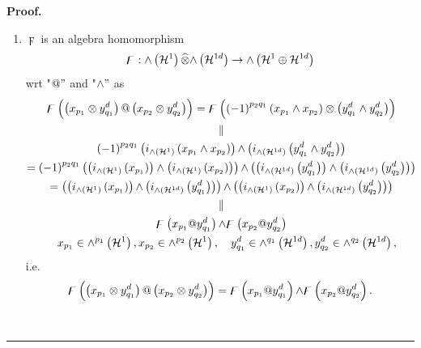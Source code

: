 \documentclass[aps,preprint]{revtex4}%
\newenvironment{proof}[1][Proof]{\noindent\textbf{#1.} }{\ \rule{0.5em}{0.5em}}
\begin{document}
\begin{proof}
\begin{enumerate}
\item $\digamma$ is an algebra homomorphism
\begin{equation}
\digamma:{\huge \wedge}\left(  \mathcal{H}^{1}\right)  \widehat{\otimes
}{\huge \wedge}\left(  \mathcal{H}^{1d}\right)  \rightarrow{\huge \wedge
}\left(  \mathcal{H}^{1}\oplus\mathcal{H}^{1d}\right)
\end{equation}
wrt "$@"$ and "$\wedge"$ as
\begin{gather}
\digamma\left(  \overset{}{\left(  x_{p_{1}}\otimes y_{q_{1}}^{d}\right)
@\left(  x_{p_{2}}\otimes y_{q_{2}}^{d}\right)  }\right)  =\digamma\left(
\overset{}{\left(  -1\right)  ^{p_{2}q_{1}}\left(  x_{p_{1}}\wedge x_{p_{2}%
}\right)  \otimes\left(  y_{q_{1}}^{d}\wedge y_{q_{2}}^{d}\right)  }\right) \\
\parallel\\
\left(  -1\right)  ^{p_{2}q_{1}}\left(  i_{{\huge \wedge}\left(
\mathcal{H}^{1}\right)  }\left(  x_{p_{1}}\wedge x_{p_{2}}\right)  \right)
{\Large \wedge}\left(  i_{{\huge \wedge}\left(  \mathcal{H}^{1d}\right)
}\left(  y_{q_{1}}^{d}\wedge y_{q_{2}}^{d}\right)  \right) \\
=\left(  -1\right)  ^{p_{2}q_{1}}\left(  \left(  i_{{\huge \wedge}\left(
\mathcal{H}^{1}\right)  }\left(  x_{p_{1}}\right)  \right)  \wedge\left(
i_{{\huge \wedge}\left(  \mathcal{H}^{1}\right)  }\left(  x_{p_{2}}\right)
\right)  \right)  {\Large \wedge}\left(  \left(  i_{{\huge \wedge}\left(
\mathcal{H}^{1d}\right)  }\left(  y_{q_{1}}^{d}\right)  \right)  \wedge\left(
i_{{\huge \wedge}\left(  \mathcal{H}^{1d}\right)  }\left(  y_{q_{2}}%
^{d}\right)  \right)  \right) \\
=\left(  \left(  i_{{\huge \wedge}\left(  \mathcal{H}^{1}\right)  }\left(
x_{p_{1}}\right)  \right)  {\Large \wedge}\left(  i_{{\huge \wedge}\left(
\mathcal{H}^{1d}\right)  }\left(  y_{q_{1}}^{d}\right)  \right)  \right)
{\Large \wedge}\left(  \left(  i_{{\huge \wedge}\left(  \mathcal{H}%
^{1}\right)  }\left(  x_{p_{2}}\right)  \right)  {\Large \wedge}\left(
i_{{\huge \wedge}\left(  \mathcal{H}^{1d}\right)  }\left(  y_{q_{2}}%
^{d}\right)  \right)  \right) \\
\parallel\\
\digamma\left(  x_{p_{1}}@y_{q_{1}}^{d}\right)  {\Large \wedge}\digamma\left(
x_{p_{2}}@y_{q_{2}}^{d}\right) \\
\quad x_{p_{1}}\in{\huge \wedge}^{p_{1}}\left(  \mathcal{H}^{1}\right)
,x_{p_{2}}\in{\huge \wedge}^{p_{2}}\left(  \mathcal{H}^{1}\right)  ,\quad
y_{q_{1}}^{d}\in{\huge \wedge}^{q_{1}}\left(  \mathcal{H}^{1d}\right)
,y_{q_{2}}^{d}\in{\huge \wedge}^{q_{2}}\left(  \mathcal{H}^{1d}\right)  ,
\end{gather}
i.e.
\begin{equation}
\digamma\left(  \overset{}{\left(  x_{p_{1}}\otimes y_{q_{1}}^{d}\right)
@\left(  x_{p_{2}}\otimes y_{q_{2}}^{d}\right)  }\right)  =\digamma\left(
\overset{}{x_{p_{1}}@y_{q_{1}}^{d}}\right)  {\Large \wedge}\digamma\left(
\overset{}{x_{p_{2}}@y_{q_{2}}^{d}}\right)  .
\end{equation}



\end{enumerate}
\end{proof}
\end{document}
